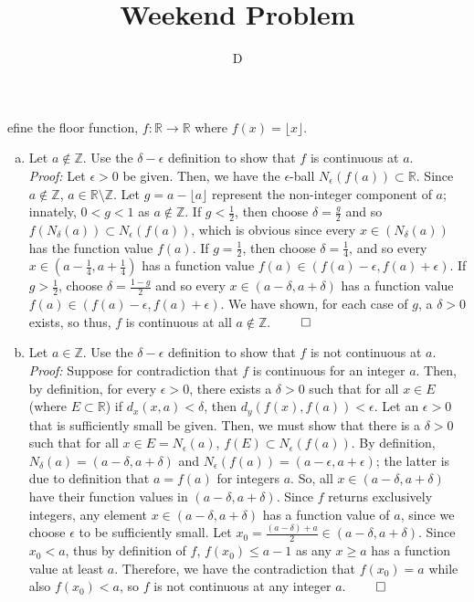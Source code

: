 \documentclass[12pt]{article}
\theoremstyle{definition}
\theoremstyle{named}
\begin{document}
\title{Weekend Problem}
\author{}
\date{}
\maketitle
\date

    Define the floor function, $f: \mathbb{R} \to \mathbb{R}$ where $f(x) = \lfloor x \rfloor$. 
    \begin{enumerate}[(a)]
        \item Let $a \notin \mathbb{Z}$. Use the $\delta - \epsilon$ definition to show that $f$ is continuous at $a$. 
        \\
        \textit{Proof:} Let $\epsilon > 0$ be given. Then, we have the $\epsilon$-ball $N_\epsilon(f(a)) \subset \mathbb{R}$. Since $a \notin \mathbb{Z}$, $a \in \mathbb{R} \setminus \mathbb{Z}$. Let $g = a - \lfloor a \rfloor$ represent the non-integer component of $a$; innately, $0 < g < 1$ as $a \notin \mathbb{Z}$. If $g < \frac{1}{2}$, then choose $\delta = \frac{g}{2}$ and so $f\left(N_\delta(a)\right) \subset N_\epsilon(f(a))$, which is obvious since every $x \in \left(N_\delta(a)\right)$ has the function value $f(a)$. If $g = \frac{1}{2}$, then choose $\delta = \frac{1}{4}$, and so every $x \in \left(a - \frac{1}{4}, a + \frac{1}{4}\right)$ has a function value $f(a) \in \left(f(a) - \epsilon, f(a) + \epsilon\right)$. If $g > \frac{1}{2}$, choose $\delta = \frac{1-g}{2}$ and so every $x \in (a - \delta, a + \delta)$ has a function value $f(a) \in \left(f(a) - \epsilon, f(a) + \epsilon\right)$. We have shown, for each case of $g$, a $\delta > 0$ exists, so thus, $f$ is continuous at all $a \notin \mathbb{Z}$. $\qed$
        \item Let $a \in \mathbb{Z}$. Use the $\delta - \epsilon$ definition to show that $f$ is not continuous at $a$. 
        \\
        \textit{Proof:} Suppose for contradiction that $f$ is continuous for an integer $a$. Then, by definition, for every $\epsilon > 0$, there exists a $\delta > 0$ such that for all $x \in E$ (where $E \subset \mathbb{R}$) if $d_x(x,a) < \delta$, then $d_y(f(x), f(a)) < \epsilon$. Let an $\epsilon > 0$ that is sufficiently small be given. Then, we must show that there is a $\delta > 0$ such that for all $x \in E = N_\epsilon(a)$, $f(E) \subset N_\epsilon(f(a))$. By definition, $N_\delta(a) = (a - \delta, a + \delta)$ and $N_\epsilon(f(a)) = (a - \epsilon, a + \epsilon)$; the latter is due to definition that $a = f(a)$ for integers $a$. So, all $x \in (a - \delta, a + \delta)$ have their function values in $(a - \delta, a + \delta)$. Since $f$ returns exclusively integers, any element $x \in (a - \delta, a + \delta)$ has a function value of $a$, since we choose $\epsilon$ to be sufficiently small. Let $x_0 = \frac{(a - \delta) + a}{2} \in (a - \delta, a + \delta)$. Since $x_0 < a$, thus by definition of $f$, $f\left(x_0\right) \leq a-1$ as any $x \geq a$ has a function value at least $a$. Therefore, we have the contradiction that $f\left(x_0\right) = a$ while also $f\left(x_0\right) < a$, so $f$ is not continuous at any integer $a$. $\qed$
    \end{enumerate}
\end{document}
